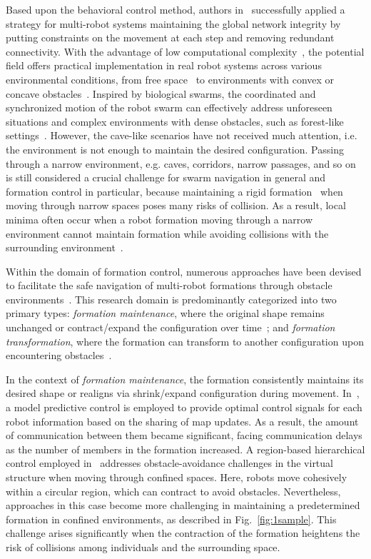Based upon the behavioral control method, authors in~\cite{8716301} successfully applied a strategy for multi-robot systems maintaining the global network integrity by putting constraints on the movement at each step and removing redundant connectivity.  With the advantage of low computational complexity~\cite{1605401,Reynolds1987}, the potential field offers practical implementation in real robot systems across various environmental conditions, from free space~\cite{Reynolds1987} to environments with convex or concave obstacles~\cite{10417519,9565893}. Inspired by biological swarms, the coordinated and synchronized motion of the robot swarm can effectively address unforeseen situations and complex environments with dense obstacles, such as forest-like settings~\cite{9981858, 9561902, 9990164}. However, the cave-like scenarios have not received much attention, i.e. the environment is not enough to maintain the desired configuration. Passing through a narrow environment, e.g. caves, corridors, narrow passages, and so on~\cite{Dang2020,9220149} is still considered a crucial challenge for swarm navigation in general and formation control in particular, because maintaining a rigid formation~\cite{736776} when moving through narrow spaces poses many risks of collision. As a result, local minima often occur when a robot formation moving through a narrow environment cannot maintain formation while avoiding collisions with the surrounding environment~\cite{Saska2020}.

Within the domain of formation control, numerous approaches have been devised to facilitate the safe navigation of multi-robot formations through obstacle environments~\cite{Saska2020,Gmez2013,Ebel2017,Roy2018,AlonsoMora2017,Fu2020,8843165,Vsrhelyi2018}. This research domain is predominantly categorized into two primary types: \textit{formation maintenance}, where the original shape remains unchanged or contract/expand the configuration over time~\cite{Saska2020,Gmez2013,Ebel2017,Roy2018}; and \textit{formation transformation}, where the formation can transform to another configuration upon encountering obstacles~\cite{AlonsoMora2017,Fu2020,8843165}.

In the context of \textit{formation maintenance}, the formation consistently maintains its desired shape or realigns via shrink/expand configuration during movement. In~\cite{Saska2020}, a model predictive control is employed to provide optimal control signals for each robot information based on the sharing of map updates. As a result, the amount of communication between them became significant, facing communication delays as the number of members in the formation increased. A region-based hierarchical control employed in~\cite{Roy2018} addresses obstacle-avoidance challenges in the virtual structure when moving through confined spaces. Here, robots move cohesively within a circular region, which can contract to avoid obstacles. Nevertheless, approaches in this case become more challenging in maintaining a predetermined formation in confined environments, as described in Fig.~\ref{fig:1sample}. This challenge arises significantly when the contraction of the formation heightens the risk of collisions among individuals and the surrounding space.


